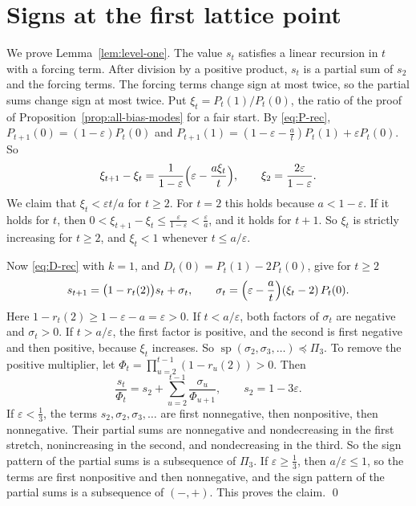 \section{Signs at the first lattice point}\label{app:signs}

\label{app:signs-level}
We prove Lemma~\ref{lem:level-one}. The value $s_t$ satisfies a
linear recursion in $t$ with a forcing term. After division by a
positive product, $s_t$ is a partial sum of $s_2$ and the forcing
terms. The forcing terms change sign at most twice, so the partial
sums change sign at most twice. Put $\xi_t=P_t(1)/P_t(0)$, the ratio
of the proof of Proposition~\ref{prop:all-bias-modes} for a fair
start. By \eqref{eq:P-rec}, $P_{t+1}(0)=(1-\varepsilon)P_t(0)$
and $P_{t+1}(1)=(1-\varepsilon-\frac at)P_t(1)+\varepsilon P_t(0)$. So
\[
 \xi_{t+1}-\xi_t=\frac1{1-\varepsilon}\Bigl(\varepsilon-\frac{a\xi_t}t\Bigr),
 \qquad\xi_2=\frac{2\varepsilon}{1-\varepsilon}.
\]
We claim that $\xi_t<\varepsilon t/a$ for $t\ge2$. For $t=2$ this holds
because $a<1-\varepsilon$. If it holds for $t$, then
$0<\xi_{t+1}-\xi_t\le\frac\varepsilon{1-\varepsilon}<\frac\varepsilon a$,
and it holds for $t+1$. So $\xi_t$ is strictly increasing for $t\ge2$, and
$\xi_t<1$ whenever $t\le a/\varepsilon$.

Now \eqref{eq:D-rec} with $k=1$, and $D_t(0)=P_t(1)-2P_t(0)$, give for $t\ge2$
\[
 s_{t+1}=\bigl(1-r_t(2)\bigr)s_t+\sigma_t,\qquad
 \sigma_t=\Bigl(\varepsilon-\frac at\Bigr)(\xi_t-2)\,P_t(0).
\]
Here $1-r_t(2)\ge1-\varepsilon-a=\varepsilon>0$. If $t<a/\varepsilon$, both
factors of $\sigma_t$ are negative and $\sigma_t>0$. If $t>a/\varepsilon$, the
first factor is positive, and the second is first negative and then positive,
because $\xi_t$ increases. So
$\operatorname{sp}(\sigma_2,\sigma_3,\dots)\preceq\Pi_3$. To remove the positive multiplier, let
$\Phi_t=\prod_{u=2}^{t-1}(1-r_u(2))>0$. Then
\[
 \frac{s_t}{\Phi_t}=s_2+\sum_{u=2}^{t-1}\frac{\sigma_u}{\Phi_{u+1}},\qquad
 s_2=1-3\varepsilon .
\]
If $\varepsilon<\frac13$, the terms $s_2,\sigma_2,\sigma_3,\dots$ are first
nonnegative, then nonpositive, then nonnegative. Their partial sums are
nonnegative and nondecreasing in the first stretch, nonincreasing in the
second, and nondecreasing in the third. So the sign pattern of the partial
sums is a subsequence of $\Pi_3$. If $\varepsilon\ge\frac13$, then
$a/\varepsilon\le1$, so the terms are first nonpositive and then nonnegative,
and the sign pattern of the partial sums is a subsequence of $(-,+)$. This
proves the claim. \qed
